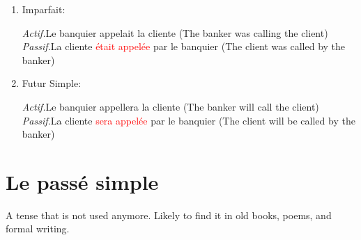 \documentclass{book}
\begin{document}
\begin{itemize}
\begin{enumerate}
                \item Imparfait:
                    \begin{center}
                        \textit{Actif.}Le banquier appelait la cliente (The banker was calling the client) \\
                        \textit{Passif.}La cliente \textcolor{red}{était appelée} par le banquier (The client was called by the banker)
                    \end{center}

                \item Futur Simple:
                    \begin{center}
                        \textit{Actif.}Le banquier appellera la cliente (The banker will call the client) \\
                        \textit{Passif.}La cliente \textcolor{red}{sera appelée} par le banquier (The client will be called by the banker)
                    \end{center}
            \end{enumerate}
    \end{itemize}

\chapter{Le passé simple}
A tense that is not used anymore. Likely to find it in old books, poems, and formal writing. 
\end{document}
